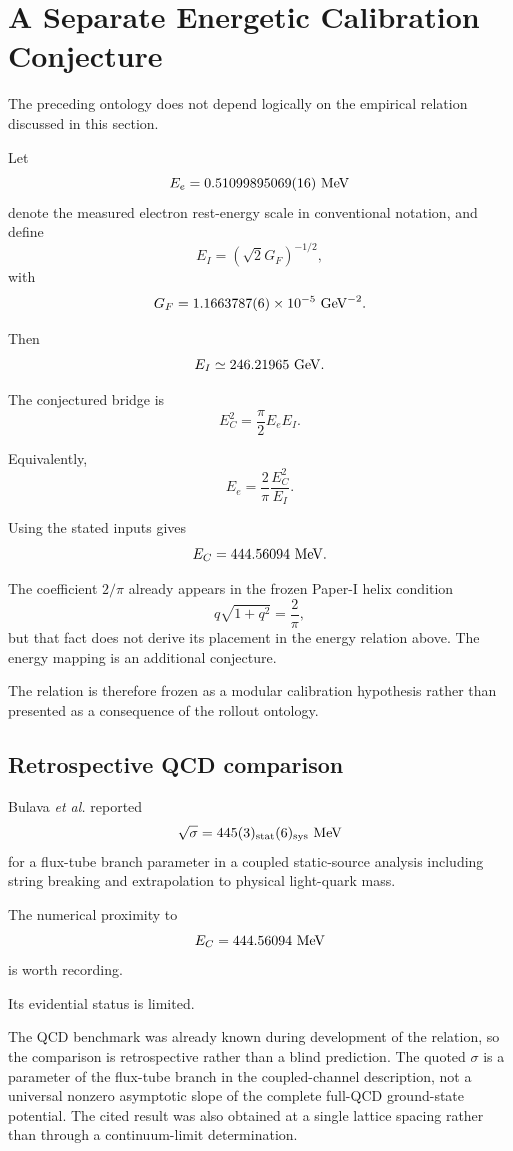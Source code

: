 \documentclass[10pt]{article}
\begin{document}
\section{A Separate Energetic Calibration Conjecture}\label{a-separate-energetic-calibration-conjecture}

The preceding ontology does not depend logically on the empirical relation discussed in this section.

Let \[
E_e=0.51099895069(16)\ {\rm MeV}
\] denote the measured electron rest-energy scale in conventional notation, and define \[
E_I=(\sqrt2G_F)^{-1/2},
\] with \[
G_F=1.1663787(6)\times10^{-5}\ {\rm GeV}^{-2}.
\]

Then \[
E_I\simeq246.21965\ {\rm GeV}.
\]

The conjectured bridge is \[
\boxed{
E_C^2=\frac{\pi}{2}E_eE_I.
}
\]

Equivalently, \[
E_e=\frac{2}{\pi}\frac{E_C^2}{E_I}.
\]

Using the stated inputs gives \[
E_C=444.56094\ {\rm MeV}.
\]

The coefficient \(2/\pi\) already appears in the frozen Paper-I helix condition \[
q\sqrt{1+q^2}=\frac{2}{\pi},
\] but that fact does not derive its placement in the energy relation above. The energy mapping is an additional conjecture.

The relation is therefore frozen as a modular calibration hypothesis rather than presented as a consequence of the rollout ontology.

\subsection{Retrospective QCD comparison}\label{retrospective-qcd-comparison}

Bulava \emph{et al.} \cite{Bulava2024} reported \[
\sqrt{\sigma}
=
445(3)_{\rm stat}(6)_{\rm sys}\ {\rm MeV}
\] for a flux-tube branch parameter in a coupled static-source analysis including string breaking and extrapolation to physical light-quark mass.

The numerical proximity to \[
E_C=444.56094\ {\rm MeV}
\] is worth recording.

Its evidential status is limited.

The QCD benchmark was already known during development of the relation, so the comparison is retrospective rather than a blind prediction. The quoted \(\sigma\) is a parameter of the flux-tube branch in the coupled-channel description, not a universal nonzero asymptotic slope of the complete full-QCD ground-state potential. The cited result was also obtained at a single lattice spacing rather than through a continuum-limit determination.
\end{document}
